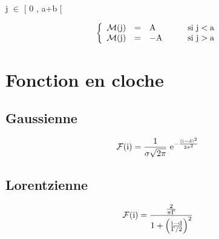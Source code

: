 \begin{minipage}[c]{.45\linewidth}
\begin{center}
j $\in$ $\big[$ 0 , a+b $\big[$
\end{center}
\[
\left\{ \begin{array}{rcll}
\mathcal{M}(\text{j}) & = & \text{A} & \qquad\text{si j}<\text{a} \\
\mathcal{M}(\text{j}) & = & -\text{A} & \qquad\text{si j}>\text{a} \end{array} \right.
\]
\end{minipage}
\hfill
\begin{minipage}[c]{.45\linewidth}
\begin{center}
 \end{center}
\end{minipage}
\section{Fonction en cloche}
\subsection{Gaussienne}
\[
\mathcal{F}\text{(i)}=\frac{1}{\sigma\sqrt{2\pi}}\text{ e}^{-\frac{(\text{i}-\text{d})^2}{2\sigma^2}}
\]
\subsection{Lorentzienne}
\[
\mathcal{F}\text{(i)}=\frac{\frac{2}{\pi\Gamma}}{1+\left(\frac{\text{i}-\text{d}}{\Gamma/2}\right)^2}
\]





